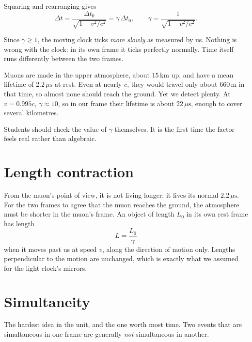 Squaring and rearranging gives
\begin{equation}
  \Delta t = \frac{\Delta t_0}{\sqrt{1 - v^2/c^2}} = \gamma\,\Delta t_0,
  \qquad \gamma = \frac{1}{\sqrt{1 - v^2/c^2}}. \label{eq:dilation}
\end{equation}

Since $\gamma \ge 1$, the moving clock ticks \emph{more slowly} as measured by us. Nothing is wrong with the clock: in its own frame it ticks perfectly normally. Time itself runs differently between the two frames.

\begin{example}[Muons]
Muons are made in the upper atmosphere, about $15\,\mathrm{km}$ up, and have a mean lifetime of $2.2\,\mu\mathrm{s}$ at rest. Even at nearly $c$, they would travel only about $660\,\mathrm{m}$ in that time, so almost none should reach the ground. Yet we detect plenty. At $v = 0.995c$, $\gamma \approx 10$, so in our frame their lifetime is about $22\,\mu\mathrm{s}$, enough to cover several kilometres.
\end{example}

Students should check the value of $\gamma$ themselves. It is the first time the factor feels real rather than algebraic.

\section{Length contraction}

From the muon's point of view, it is not living longer: it lives its normal $2.2\,\mu\mathrm{s}$. For the two frames to agree that the muon reaches the ground, the atmosphere must be shorter in the muon's frame. An object of length $L_0$ in its own rest frame has length
\begin{equation}
  L = \frac{L_0}{\gamma} \label{eq:contraction}
\end{equation}
when it moves past us at speed $v$, along the direction of motion only. Lengths perpendicular to the motion are unchanged, which is exactly what we assumed for the light clock's mirrors.

\section{Simultaneity}

The hardest idea in the unit, and the one worth most time. Two events that are simultaneous in one frame are generally \emph{not} simultaneous in another.

